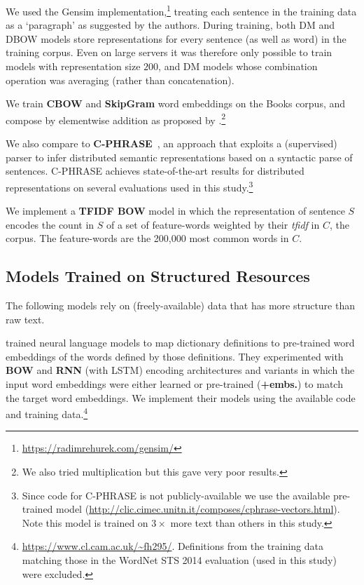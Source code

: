 \documentclass[11pt,letterpaper]{article}
\begin{document}
We used the Gensim implementation,\footnote{\scriptsize \url{https://radimrehurek.com/gensim/}} treating each sentence in the training data as a `paragraph' as suggested by the authors. During training, both DM and DBOW models store representations for every sentence (as well as word) in the training corpus. Even on large servers it was therefore only possible to train models with representation size \(200\), and DM models whose combination operation was averaging (rather than concatenation). 

\vspace{5pt} We train {\bf CBOW} and {\bf SkipGram} word embeddings \cite{mikolov2013distributed} on the Books corpus, and compose by elementwise addition as proposed by .\footnote{We also tried multiplication but this gave very poor results.} 

We also compare to {\bf C-PHRASE}~\cite{marcobaronijointly}, an approach that exploits a (supervised) parser to infer distributed semantic representations based on a syntactic parse of sentences. C-PHRASE achieves state-of-the-art results for distributed representations on several evaluations used in this study.\footnote{Since code for C-PHRASE is not publicly-available we use the available pre-trained model ({\scriptsize \url{http://clic.cimec.unitn.it/composes/cphrase-vectors.html}}). Note this model is trained on \(3\times\) more text than others in this study.}

\vspace{5pt} We implement a {\bf TFIDF BOW} model in which the representation of sentence \(S\) encodes the count in \(S\) of a set of feature-words weighted by their \emph{tfidf} in \(C\), the corpus. The feature-words are the 200,000 most common words in \(C\). 

\subsection{Models Trained on Structured Resources}
The following models rely on (freely-available) data that has more structure than raw text.

\vspace{5pt}  trained neural language models to map dictionary definitions to pre-trained word embeddings of the words defined by those definitions. They experimented with {\bf BOW} and {\bf RNN} (with LSTM) encoding architectures and variants in which the input word embeddings were either learned or pre-trained ({\bf+embs.}) to match the target word embeddings. We implement their models using the available code and training data.\footnote{{\scriptsize \url{https://www.cl.cam.ac.uk/~fh295/}}. Definitions from the training data matching those in the WordNet STS 2014 evaluation (used in this study) were excluded.}
\end{document}
